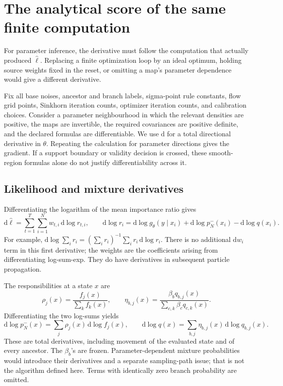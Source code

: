 \documentclass[11pt,a4paper]{article}
\newcommand{\dd}{\mathrm d}
\begin{document}
\section{The analytical score of the same finite computation}
\label{sec:analytical-score}

For parameter inference, the derivative must follow the computation that
actually produced \(\widehat\ell\). Replacing a finite optimization loop by
an ideal optimum, holding source weights fixed in the reset, or omitting
a map's parameter dependence would give a different derivative.

Fix all base noises, ancestor and branch labels, sigma-point rule constants,
flow grid points, Sinkhorn iteration counts, optimizer iteration counts,
and calibration choices. Consider a parameter neighbourhood in which the
relevant densities are positive, the maps are invertible, the required
covariances are positive definite, and the declared formulas are
differentiable. We use \(\dd\) for a total directional derivative in
\(\theta\). Repeating the calculation for parameter directions gives the
gradient. If a support boundary or validity decision is crossed, these
smooth-region formulas alone do not justify differentiability across it.

\subsection{Likelihood and mixture derivatives}

Differentiating the logarithm of the mean importance ratio gives
\begin{equation}
\label{eq:total-score}
 \dd\widehat\ell
 =\sum_{t=1}^T\sum_{i=1}^Nw_{t,i}\,\dd\log r_{t,i},
 \qquad
 \dd\log r_i=\dd\log g_\theta(y\mid x_i)
             +\dd\log p_N^-(x_i)-\dd\log q(x_i).
\end{equation}
For example,
\(\dd\log\sum_i r_i=(\sum_i r_i)^{-1}\sum_i r_i\,\dd\log r_i\).
There is no additional \(\dd w_i\) term in this first derivative;
the weights are the coefficients arising from differentiating log-sum-exp.
They do have derivatives in subsequent particle propagation.

The responsibilities at a state \(x\) are
\begin{equation}
\label{eq:responsibilities}
 \rho_j(x)=\frac{f_j(x)}{\sum_k f_k(x)},\qquad
 \eta_{b,j}(x)=
 \frac{\beta_bq_{b,j}(x)}
      {\sum_{c,k}\beta_cq_{c,k}(x)}.
\end{equation}
Differentiating the two log-sums yields
\begin{equation}
\label{eq:mixture-differentials}
 \dd\log p_N^-(x)=\sum_j\rho_j(x)\,\dd\log f_j(x),\qquad
 \dd\log q(x)=\sum_{b,j}\eta_{b,j}(x)\,\dd\log q_{b,j}(x).
\end{equation}
These are total derivatives, including movement of the evaluated state
and of every ancestor. The \(\beta_b\)'s are frozen. Parameter-dependent
mixture probabilities would introduce their derivatives and a separate
sampling-path issue; that is not the algorithm defined here. Terms with
identically zero branch probability are omitted.
\end{document}
